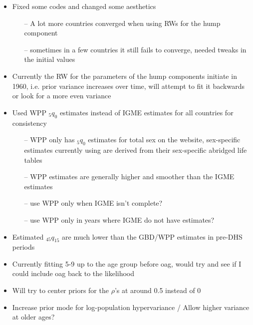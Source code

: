 \documentclass[12pt,a4paper]{article}
\date{\vspace{-5ex}}
\begin{document}
\begin{itemize}
\item Fixed some codes and changed some aesthetics
	\begin{itemize}
	\item[--] A lot more countries converged when using RWs for the hump component
	\item[--] sometimes in a few countries it still fails to converge, needed tweaks in the initial values
	\end{itemize}
\item Currently the RW for the parameters of the hump components initiate in 1960, i.e. prior variance increases over time, will attempt to fit it backwards or look for a more even variance
\item Used WPP $_5q_0$ estimates instead of IGME estimates for all countries for consistency
	\begin{itemize}
	\item[--] WPP only has $_5q_0$ estimates for total sex on the website, sex-specific estimates currently using are derived from their sex-specific abridged life tables
	\item[--] WPP estimates are generally higher and smoother than the IGME estimates	
	\item[--] use WPP only when IGME isn't complete?
	\item[--] use WPP only in years where IGME do not have estimates?
	\end{itemize}
	\item Estimated $_{45}q_{15}$ are much lower than the GBD/WPP estimates in pre-DHS periods
	\item Currently fitting 5-9 up to the age group before oag, would try and see if I could include oag back to the likelihood
	\item Will try to center priors for the $\rho$'s at around 0.5 instead of 0
	\item Increase prior mode for log-population hypervariance / Allow higher variance at older ages?
\end{itemize}

 
\end{document}
